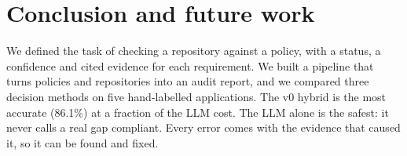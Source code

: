 \chapter{Conclusion and future work}
\label{chapter:concl}

We defined the task of checking a repository against a policy, with a status, a confidence and cited evidence for each
requirement. We built a pipeline that turns policies and repositories into an audit report, and we compared three
decision methods on five hand-labelled applications. The v0 hybrid is the most accurate (86.1\%) at a fraction of the
LLM cost. The LLM alone is the safest: it never calls a real gap compliant. Every error comes with the evidence that
caused it, so it can be found and fixed.

